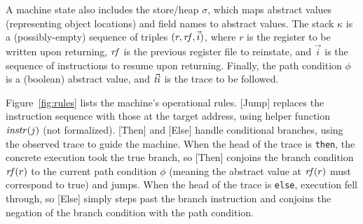
A machine state also includes the store/heap $\sigma$, which maps
abstract values (representing object locations) and field names to abstract values. The stack
$\kappa$ is a (possibly-empty) sequence of triples
$(r, \mathit{rf}, \vec{i})$, where $r$ is the register to be written upon
returning, $\mathit{rf}$ is the previous register file to reinstate, and
$\vec{i}$ is the sequence of instructions to resume upon
returning. Finally, the path condition $\phi$ is a (boolean) abstract
value, and $\vec{\mathit{ti}}$ is the trace to be followed.



Figure~\ref{fig:rules} lists the machine's operational rules.
[Jump] replaces the instruction sequence with those at the target address,
using helper function $\mathit{instr}(j)$ (not formalized).
[Then] and [Else] handle conditional branches, using the observed
trace to guide the machine.
When the head of the trace is \texttt{then}, the concrete
execution took the true branch, so [Then]
conjoins the branch condition $\mathit{rf}(r)$ to
the current path condition $\phi$ (meaning the abstract value at
$\mathit{rf}(r)$ must correspond to true) and jumps.
When the head of the trace is \texttt{else},
execution fell through, so [Else] simply steps past the branch
instruction and conjoins the negation of the branch condition
with the path condition.

